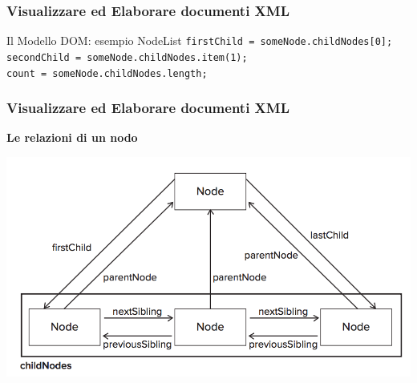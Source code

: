 \begin{frame}
    \frametitle{Visualizzare ed Elaborare documenti XML}
    \addtocounter{nframe}{1}
    

     \begin{block}{Il Modello DOM: esempio NodeList}
        \texttt{firstChild = someNode.childNodes[0];}
        \\\texttt{secondChild = someNode.childNodes.item(1); }
        \\\texttt{count = someNode.childNodes.length;}
     \end{block}

\end{frame}

\begin{frame}
    \frametitle{Visualizzare ed Elaborare documenti XML}
    \addtocounter{nframe}{1}

    \textbf{Le relazioni di un nodo}
    
    \begin{center}
        \includegraphics[width=.9\textwidth]{imgs/nodeRelations.png}
    \end{center}

\end{frame}

